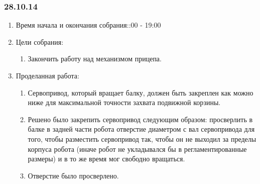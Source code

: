 
\subsubsection{28.10.14}

\begin{enumerate}
	\item Время начала и окончания собрания::00 - 19:00
	\item Цели собрания:\newline
	\begin{enumerate}
	  \item Закончить работу над механизмом прицепа.\newline
	  
    \end{enumerate}
    
	\item Проделанная работа:\newline
	\begin{enumerate}
	  \item Сервопривод, который вращает балку, должен быть закреплен как можно ниже для максимальной точности захвата подвижной корзины.\newline
      
      \item Решено было закрепить сервопривод следующим образом: просверлить в балке в задней части робота отверстие диаметром с вал сервопривода для того, чтобы разместить сервопривод так, чтобы он не выходил за пределы корпуса робота (иначе робот не укладывался бы в регламентированные размеры) и в то же время мог свободно вращаться.\newline
      
      \item Отверстие было просверлено.\newline
      

\end{enumerate}
\end{enumerate}
